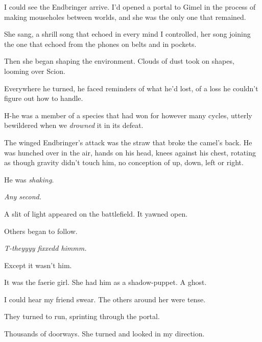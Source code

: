 I could see the Endbringer arrive.  I'd opened a portal to Gimel in the process of making mouseholes between worlds, and she was the only one that remained.



She sang, a shrill song that echoed in every mind I controlled, her song joining the one that echoed from the phones on belts and in pockets.



Then she began shaping the environment.  Clouds of dust took on shapes, looming over Scion.



Everywhere he turned, he faced reminders of what he'd lost, of a loss he couldn't figure out how to handle.



H-he was a member of a species that had won for however many cycles, utterly bewildered when we \emph{drowned} it in its defeat.



The winged Endbringer's attack was the straw that broke the camel's back.  He was hunched over in the air, hands on his head, knees against his chest, rotating as though gravity didn't touch him, no conception of up, down, left or right.



He was \emph{shaking}.



\emph{Any second.}



A slit of light appeared on the battlefield.  It yawned open.



Others began to follow.



\emph{T-theyyyy fixxedd himmm.}



Except it wasn't him.



It was the faerie girl.  She had him as a shadow-puppet.  A ghost.



I could hear my friend swear.  The others around her were tense.



They turned to run, sprinting through the portal.



Thousands of doorways.  She turned and looked in my direction.



